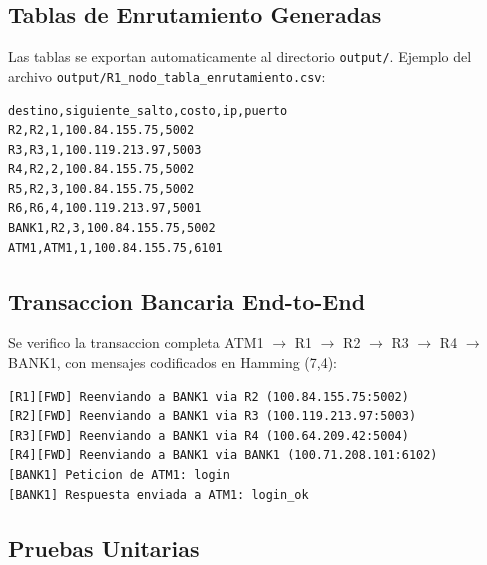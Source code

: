 ﻿\documentclass[12pt, a4paper]{article}
\begin{document}
\subsection{Tablas de Enrutamiento Generadas}

Las tablas se exportan automaticamente al directorio \texttt{output/}. Ejemplo
del archivo \texttt{output/R1\_nodo\_tabla\_enrutamiento.csv}:

\begin{lstlisting}[caption=Contenido de R1\_nodo\_tabla\_enrutamiento.csv]
destino,siguiente_salto,costo,ip,puerto
R2,R2,1,100.84.155.75,5002
R3,R3,1,100.119.213.97,5003
R4,R2,2,100.84.155.75,5002
R5,R2,3,100.84.155.75,5002
R6,R6,4,100.119.213.97,5001
BANK1,R2,3,100.84.155.75,5002
ATM1,ATM1,1,100.84.155.75,6101
\end{lstlisting}

\subsection{Transaccion Bancaria End-to-End}

Se verifico la transaccion completa ATM1 $\to$ R1 $\to$ R2 $\to$ R3 $\to$
R4 $\to$ BANK1, con mensajes codificados en Hamming (7,4):

\begin{lstlisting}[caption=Flujo de reenvio observado en consola]
[R1][FWD] Reenviando a BANK1 via R2 (100.84.155.75:5002)
[R2][FWD] Reenviando a BANK1 via R3 (100.119.213.97:5003)
[R3][FWD] Reenviando a BANK1 via R4 (100.64.209.42:5004)
[R4][FWD] Reenviando a BANK1 via BANK1 (100.71.208.101:6102)
[BANK1] Peticion de ATM1: login
[BANK1] Respuesta enviada a ATM1: login_ok
\end{lstlisting}

\subsection{Pruebas Unitarias}
\end{document}
